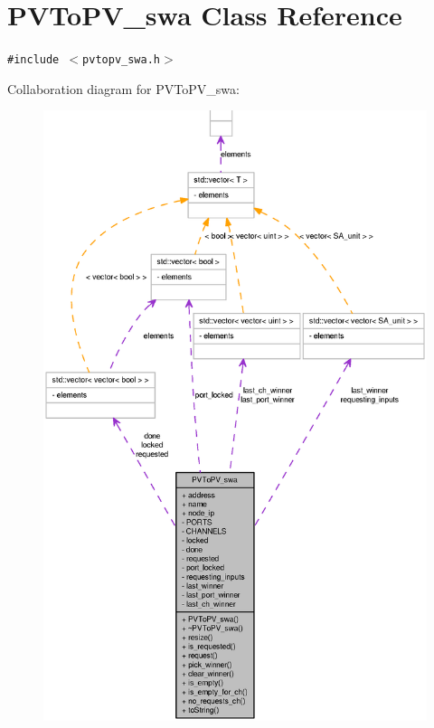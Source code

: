 \section{PVToPV\_\-swa Class Reference}
\label{classPVToPV__swa}
{\tt \#include $<$pvtopv\_\-swa.h$>$}

Collaboration diagram for PVToPV\_\-swa:\nopagebreak
\begin{figure}[H]
\begin{center}
\leavevmode
\includegraphics[width=400pt]{classPVToPV__swa__coll__graph}
\end{center}
\end{figure}
